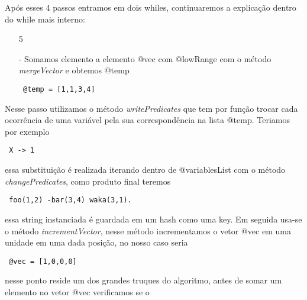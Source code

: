 \documentclass[a4paper]{article}
\begin{document}
Após esses 4 passos entramos em dois whiles, continuaremos a explicação dentro do while mais interno:

\begin{itemize}
\item[5]{- Somamos elemento a elemento @vec com @lowRange com o método \textit{mergeVector} e obtemos @temp 
\begin{verbatim} @temp = [1,1,3,4] \end{verbatim}}
\end{itemize}
Nesse passo utilizamos o método \textit{writePredicates} que tem por função trocar cada ocorrência de uma variável pela sua correspondência na lista @temp. Teriamos por exemplo 
\begin{verbatim} X -> 1 \end{verbatim}
essa substituição é realizada iterando dentro de @variablesList com o método \textit{changePredicates}, como produto final teremos
\begin{verbatim} foo(1,2) -bar(3,4) waka(3,1). \end{verbatim}

essa string instanciada é guardada em um hash como uma key. Em seguida usa-se o método \textit{incrementVector}, nesse método incrementamos o vetor @vec em uma unidade em uma dada posição, no nosso caso seria 
\begin{verbatim} @vec = [1,0,0,0] \end{verbatim}
nesse ponto reside um dos grandes truques do algoritmo, antes de somar um elemento no vetor @vec verificamos se o
\end{document}
